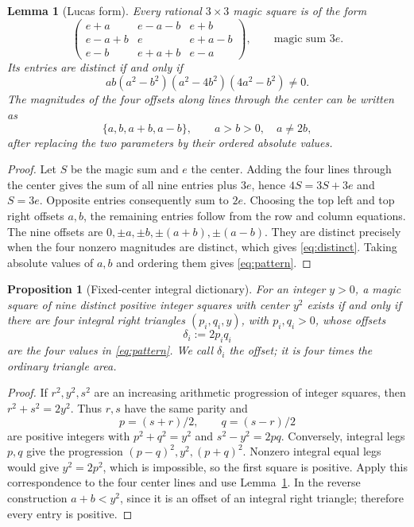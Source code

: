 \documentclass[11pt]{article}
\newtheorem{proposition}[theorem]{Proposition}
\newtheorem{lemma}[theorem]{Lemma}
\theoremstyle{definition}\newtheorem{definition}[theorem]{Definition}
\theoremstyle{remark}\newtheorem{remark}[theorem]{Remark}
\begin{document}
\begin{lemma}[Lucas form]\label{lem:lucas}
Every rational $3\times3$ magic square is of the form
\[
\begin{pmatrix}
e+a&e-a-b&e+b\\
e-a+b&e&e+a-b\\
e-b&e+a+b&e-a
\end{pmatrix},\qquad \text{magic sum }3e.
\]
Its entries are distinct if and only if
\begin{equation}\label{eq:distinct}
ab(a^2-b^2)(a^2-4b^2)(4a^2-b^2)\ne0.
\end{equation}
The magnitudes of the four offsets along lines through the center can be written as
\begin{equation}\label{eq:pattern}
\{a,b,a+b,a-b\},\qquad a>b>0,\quad a\ne2b,
\end{equation}
after replacing the two parameters by their ordered absolute values.
\end{lemma}
\begin{proof}
Let $S$ be the magic sum and $e$ the center. Adding the four lines through the center gives the sum of all nine entries plus $3e$, hence $4S=3S+3e$ and $S=3e$. Opposite entries consequently sum to $2e$. Choosing the top left and top right offsets $a,b$, the remaining entries follow from the row and column equations. The nine offsets are $0,\pm a,\pm b,\pm(a+b),\pm(a-b)$. They are distinct precisely when the four nonzero magnitudes are distinct, which gives \eqref{eq:distinct}. Taking absolute values of $a,b$ and ordering them gives \eqref{eq:pattern}.
\end{proof}

\begin{proposition}[Fixed-center integral dictionary]\label{prop:dictionary}
For an integer $y>0$, a magic square of nine distinct positive integer squares with center $y^2$ exists if and only if there are four integral right triangles $(p_i,q_i,y)$, with $p_i,q_i>0$, whose offsets
\[
\delta_i:=2p_iq_i
\]
are the four values in \eqref{eq:pattern}. We call $\delta_i$ the \emph{offset}; it is four times the ordinary triangle area.
\end{proposition}
\begin{proof}
If $r^2,y^2,s^2$ are an increasing arithmetic progression of integer squares, then $r^2+s^2=2y^2$. Thus $r,s$ have the same parity and
\[
p=(s+r)/2,\qquad q=(s-r)/2
\]
are positive integers with $p^2+q^2=y^2$ and $s^2-y^2=2pq$. Conversely, integral legs $p,q$ give the progression $(p-q)^2,y^2,(p+q)^2$. Nonzero integral equal legs would give $y^2=2p^2$, which is impossible, so the first square is positive. Apply this correspondence to the four center lines and use Lemma~\ref{lem:lucas}. In the reverse construction $a+b<y^2$, since it is an offset of an integral right triangle; therefore every entry is positive.
\end{proof}
\end{document}
